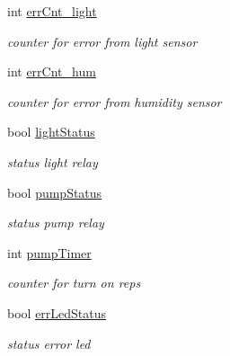 \begin{DoxyCompactItemize}
\mbox{\label{_arduino_8ino_a78d8111fe058674f6e1cb42c57c7ad94}} 
int \hyperlink{_arduino_8ino_a78d8111fe058674f6e1cb42c57c7ad94}{err\+Cnt\+\_\+light}
\begin{DoxyCompactList}\small\item\em counter for error from light sensor \end{DoxyCompactList}\item 
\mbox{\label{_arduino_8ino_a8fa83054915d03b2649601aa6c2881e9}} 
int \hyperlink{_arduino_8ino_a8fa83054915d03b2649601aa6c2881e9}{err\+Cnt\+\_\+hum}
\begin{DoxyCompactList}\small\item\em counter for error from humidity sensor \end{DoxyCompactList}\item 
\mbox{\label{_arduino_8ino_ab22552dcafcc63428380f986daa57a7a}} 
bool \hyperlink{_arduino_8ino_ab22552dcafcc63428380f986daa57a7a}{light\+Status}
\begin{DoxyCompactList}\small\item\em status light relay \end{DoxyCompactList}\item 
\mbox{\label{_arduino_8ino_afb07fce91e776c20174a8dad1a9b6e55}} 
bool \hyperlink{_arduino_8ino_afb07fce91e776c20174a8dad1a9b6e55}{pump\+Status}
\begin{DoxyCompactList}\small\item\em status pump relay \end{DoxyCompactList}\item 
\mbox{\label{_arduino_8ino_a1384c71f69c4e12ff799f524a8314306}} 
int \hyperlink{_arduino_8ino_a1384c71f69c4e12ff799f524a8314306}{pump\+Timer}
\begin{DoxyCompactList}\small\item\em counter for turn on reps \end{DoxyCompactList}\item 
\mbox{\label{_arduino_8ino_ac8c7461973f3ec00368f016d3b9dc5d4}} 
bool \hyperlink{_arduino_8ino_ac8c7461973f3ec00368f016d3b9dc5d4}{err\+Led\+Status}
\begin{DoxyCompactList}\small\item\em status error led \end{DoxyCompactList}\item 

\end{DoxyCompactItemize}
